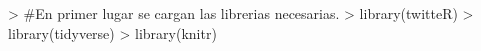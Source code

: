 
\begin{Schunk}
\begin{Sinput}
>   #En primer lugar se cargan las librerias necesarias.
>   library(twitteR)
>   library(tidyverse)
>   library(knitr)
\end{Sinput}
\end{Schunk}




